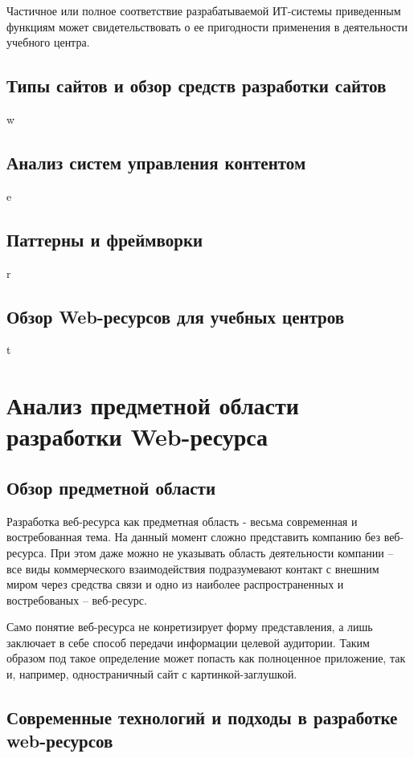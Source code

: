 Частичное или полное соответствие разрабатываемой ИТ-системы приведенным функциям может свидетельствовать о ее пригодности применения в деятельности учебного центра.

\subsection{Типы сайтов и обзор средств разработки сайтов}
w
\subsection{Анализ систем управления контентом}
e
\subsection{Паттерны и фреймворки}
r
\subsection{Обзор Web-ресурсов для учебных центров}
t

\section{Анализ предметной области разработки Web-ресурса}
\subsection{Обзор предметной области}
    Разработка веб-ресурса как предметная область - весьма современная и востребованная тема.
    На данный момент сложно представить компанию без веб-ресурса.
    При этом даже можно не указывать область деятельности компании -- все виды коммерческого взаимодействия подразумевают контакт с внешним миром через средства связи и одно из наиболее распространенных и востребованых -- веб-ресурс.
    
    Само понятие веб-ресурса не конретизирует форму представления, а лишь заключает в себе способ передачи информации целевой аудитории.
    Таким образом под такое определение может попасть как полноценное приложение, так и, например, одностраничный сайт с картинкой-заглушкой.


\subsection{Современные технологий и подходы в разработке web-ресурсов}
